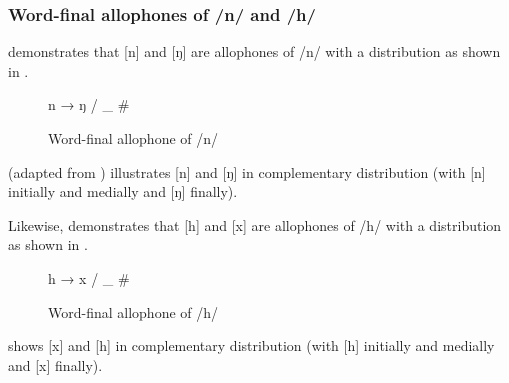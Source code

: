 \subsubsection{Word-final allophones of /n/ and /h/}\label{sec:2.2.4.1}

\citet{Bow1997c} demonstrates that [n] and [ŋ] are allophones of /n/ with a distribution as shown in .

\begin{figure}\caption{Word-final allophone of /n/\label{fig:2.2}}
n → ŋ / \_ \#
\end{figure}

 (adapted from \citealt{Bow1997c}) illustrates [n]{ }and [ŋ] in complementary distribution (with [n]{ } initially and medially and [ŋ]  finally).

\begin{table}[H] %
\caption{Complementary distribution for /n/\label{tab:2.8}}
\end{table}

Likewise, \citet{Bow1997c} demonstrates that [h] and [x] are allophones of /h/ with a distribution as shown in . 

\begin{figure}
\centering h → x / \_ \#
\caption{Word-final allophone of /h/\label{fig:2.3}}
\end{figure}

\largerpage
{} shows [x] and [h] in complementary distribution (with [h]{ }initially and medially and [x] finally).

\begin{table}[H] %
\caption{Complementary distribution for /h/\label{tab:2.9}}
\end{table}

